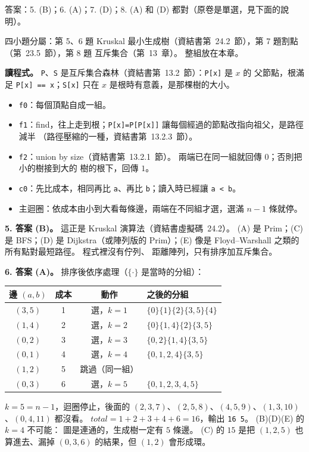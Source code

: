 \begin{pastsoln}
答案：5. (B)；6. (A)；7. (D)；8. (A) 和 (D) 都對（原卷是單選，見下面的說明）。

四小題分屬：第 5、6 題 Kruskal 最小生成樹（資結書第~24.2~節），第 7 題割點（第~23.5~節），第 8 題
互斥集合（第~13~章）。 整組放在本章。

\textbf{讀程式。} \texttt{P}、\texttt{S} 是互斥集合森林（資結書第~13.2~節）：\texttt{P[x]} 是 $x$ 的
父節點，根滿足 \texttt{P[x] == x}；\texttt{S[x]} 只在 $x$ 是根時有意義，是那棵樹的大小。
\begin{itemize}
\item \texttt{f0}：每個頂點自成一組。
\item \texttt{f1}：find，往上走到根；\texttt{P[x]=P[P[x]]} 讓每個經過的節點改指向祖父，是路徑減半
（路徑壓縮的一種，資結書第~13.2.3~節）。
\item \texttt{f2}：union by size（資結書第~13.2.1~節）。 兩端已在同一組就回傳 $0$；否則把小的樹接到大的
樹的根下，回傳 $1$。
\item \texttt{c0}：先比成本，相同再比 \texttt{a}、再比 \texttt{b}；讀入時已經讓 \texttt{a < b}。
\item 主迴圈：依成本由小到大看每條邊，兩端在不同組才選，選滿 $n - 1$ 條就停。
\end{itemize}

\textbf{5. 答案 (B)。} 這正是 Kruskal 演算法（資結書虛擬碼~24.2）。 (A) 是 Prim；(C) 是 BFS；(D) 是
Dijkstra（或陣列版的 Prim）；(E) 像是 Floyd--Warshall 之類的所有點對最短路徑。 程式裡沒有佇列、
距離陣列，只有排序加互斥集合。

\textbf{6. 答案 (A)。} 排序後依序處理（$\{\cdot\}$ 是當時的分組）：
\begin{center}
\small
\begin{tabular}{cccl}
\toprule
邊 $(a, b)$ & 成本 & 動作 & 之後的分組 \\
\midrule
$(3, 5)$ & 1 & 選，$k = 1$ & $\{0\}\{1\}\{2\}\{3,5\}\{4\}$ \\
$(1, 4)$ & 2 & 選，$k = 2$ & $\{0\}\{1,4\}\{2\}\{3,5\}$ \\
$(0, 2)$ & 3 & 選，$k = 3$ & $\{0,2\}\{1,4\}\{3,5\}$ \\
$(0, 1)$ & 4 & 選，$k = 4$ & $\{0,1,2,4\}\{3,5\}$ \\
$(1, 2)$ & 5 & 跳過（同一組） & \\
$(0, 3)$ & 6 & 選，$k = 5$ & $\{0,1,2,3,4,5\}$ \\
\bottomrule
\end{tabular}
\end{center}
$k = 5 = n - 1$，迴圈停止，後面的 $(2,3,7)$、$(2,5,8)$、$(4,5,9)$、$(1,3,10)$、$(0,4,11)$ 都沒看。
$\mathit{total} = 1 + 2 + 3 + 4 + 6 = 16$，輸出 \texttt{16 5}。 (B)(D)(E) 的 $k = 4$ 不可能：
圖是連通的，生成樹一定有 $5$ 條邊。 (C) 的 $15$ 是把 $(1,2,5)$ 也算進去、漏掉 $(0,3,6)$ 的結果，但
$(1,2)$ 會形成環。


\end{pastsoln}
